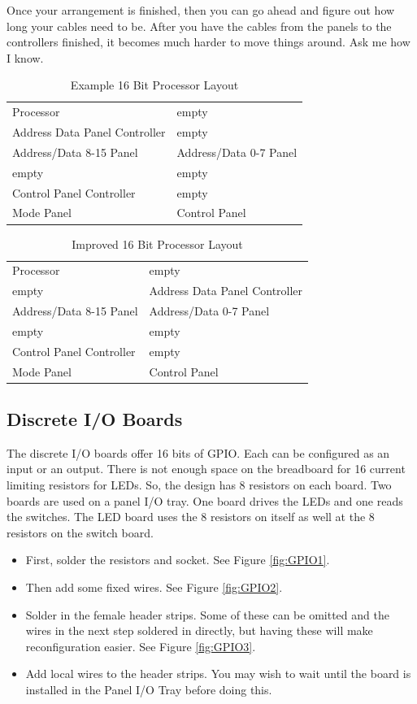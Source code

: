 \documentclass[10pt, openany]{book}
\begin{document}
Once your arrangement is finished, then you can go ahead and figure out how long your cables need to be.  After you have the cables from the panels to the controllers finished, it becomes much harder to move things around.  Ask me how I know.

\begin{table}
  \label{tbl:Basic}
  \caption{Example 16 Bit Processor Layout}
  \centering
  \begin{tabular}{|l|l|}
    \hline
    Processor & empty\\
    Address Data Panel Controller & empty\\
    Address/Data 8-15 Panel & Address/Data 0-7 Panel\\
    \hline
    empty & empty\\
    Control Panel Controller & empty\\
    Mode Panel & Control Panel\\
    \hline
  \end{tabular}
\end{table}

\begin{table}
  \label{tbl:Improved}
  \caption{Improved 16 Bit Processor Layout}
  \centering
  \begin{tabular}{|l|l|}
    \hline
    Processor & empty\\
    empty & Address Data Panel Controller\\
    Address/Data 8-15 Panel & Address/Data 0-7 Panel\\
    \hline
    empty & empty\\
    Control Panel Controller & empty\\
    Mode Panel & Control Panel\\
    \hline
  \end{tabular}
\end{table}

\subsection{Discrete I/O Boards}
The discrete I/O boards offer 16 bits of GPIO.  Each can be configured as an input or an output.  There is not enough space on the breadboard for 16 current limiting resistors for LEDs.  So, the design has 8 resistors on each board.  Two boards are used on a panel I/O tray.  One board drives the LEDs and one reads the switches.  The LED board uses the 8 resistors on itself as well at the 8 resistors on the switch board.
\begin{itemize}
  \item First, solder the resistors and socket.  See Figure \ref{fig:GPIO1}.
  \item Then add some fixed wires.  See Figure \ref{fig:GPIO2}.
  \item Solder in the female header strips.  Some of these can be omitted and the wires in the next step soldered in directly, but having these will make reconfiguration easier.  See Figure \ref{fig:GPIO3}.
  \item Add local wires to the header strips.  You may wish to wait until the board is installed in the Panel I/O Tray before doing this.
\end{itemize}
\end{document}
